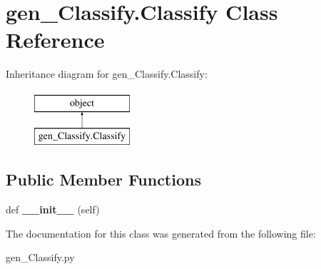 \hypertarget{classgen___classify_1_1_classify}{}\section{gen\+\_\+\+Classify.\+Classify Class Reference}
\label{classgen___classify_1_1_classify}
Inheritance diagram for gen\+\_\+\+Classify.\+Classify\+:\begin{figure}[H]
\begin{center}
\leavevmode
\includegraphics[height=2.000000cm]{classgen___classify_1_1_classify}
\end{center}
\end{figure}
\subsection*{Public Member Functions}
\begin{DoxyCompactItemize}
\item 
\hypertarget{classgen___classify_1_1_classify_ad0f05ddbb1731e1845793ae678646a50}{}def {\bfseries \+\_\+\+\_\+init\+\_\+\+\_\+} (self)\label{classgen___classify_1_1_classify_ad0f05ddbb1731e1845793ae678646a50}

\end{DoxyCompactItemize}


The documentation for this class was generated from the following file\+:\begin{DoxyCompactItemize}
\item 
gen\+\_\+\+Classify.\+py\end{DoxyCompactItemize}
